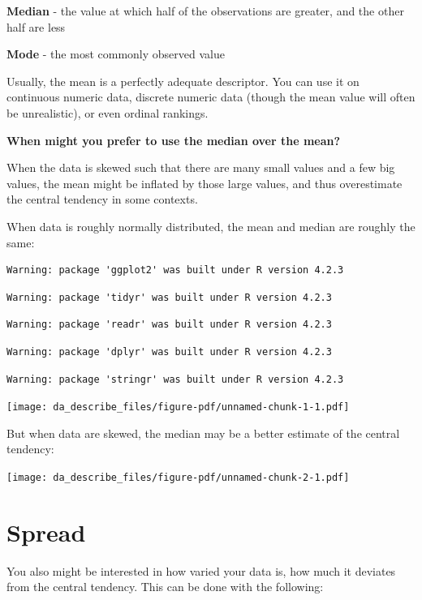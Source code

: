 \documentclass[
  letterpaper,
  DIV=11,
  numbers=noendperiod]{scrreprt}
\begin{document}
\textbf{Median} - the value at which half of the observations are
greater, and the other half are less

\textbf{Mode} - the most commonly observed value

Usually, the mean is a perfectly adequate descriptor. You can use it on
continuous numeric data, discrete numeric data (though the mean value
will often be unrealistic), or even ordinal rankings.

\textbf{When might you prefer to use the median over the mean?}

When the data is skewed such that there are many small values and a few
big values, the mean might be inflated by those large values, and thus
overestimate the central tendency in some contexts.

When data is roughly normally distributed, the mean and median are
roughly the same:

\begin{verbatim}
Warning: package 'ggplot2' was built under R version 4.2.3
\end{verbatim}

\begin{verbatim}
Warning: package 'tidyr' was built under R version 4.2.3
\end{verbatim}

\begin{verbatim}
Warning: package 'readr' was built under R version 4.2.3
\end{verbatim}

\begin{verbatim}
Warning: package 'dplyr' was built under R version 4.2.3
\end{verbatim}

\begin{verbatim}
Warning: package 'stringr' was built under R version 4.2.3
\end{verbatim}

\texttt{[image: da\_describe\_files/figure-pdf/unnamed-chunk-1-1.pdf]}

But when data are skewed, the median may be a better estimate of the
central tendency:

\texttt{[image: da\_describe\_files/figure-pdf/unnamed-chunk-2-1.pdf]}

\section{Spread}\label{spread}

You also might be interested in how varied your data is, how much it
deviates from the central tendency. This can be done with the following:
\end{document}
